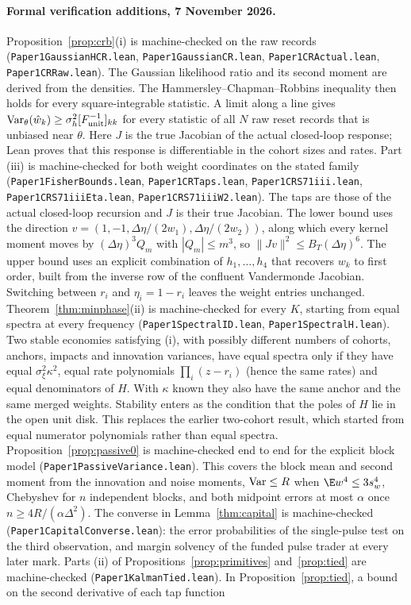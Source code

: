 \paragraph{Formal verification additions, 7 November 2026.} Proposition~\ref{prop:crb}(i) is machine-checked on the raw records (\nolinkurl{Paper1GaussianHCR.lean}, \nolinkurl{Paper1GaussianCR.lean}, \nolinkurl{Paper1CRActual.lean}, \nolinkurl{Paper1CRRaw.lean}). The Gaussian likelihood ratio and its second moment are derived from the densities. The Hammersley--Chapman--Robbins inequality then holds for every square-integrable statistic. A limit along a line gives ${\rm Var}_\theta(\hat w_k)\ge\sigma_h^2[F_{\rm unit}^{-1}]_{kk}$ for every statistic of all $N$ raw reset records that is unbiased near $\theta$. Here $J$ is the true Jacobian of the actual closed-loop response; Lean proves that this response is differentiable in the cohort sizes and rates. Part (iii) is machine-checked for both weight coordinates on the stated family (\nolinkurl{Paper1FisherBounds.lean}, \nolinkurl{Paper1CRTaps.lean}, \nolinkurl{Paper1CRS71iii.lean}, \nolinkurl{Paper1CRS71iiiEta.lean}, \nolinkurl{Paper1CRS71iiiW2.lean}). The taps are those of the actual closed-loop recursion and $J$ is their true Jacobian. The lower bound uses the direction $v=(1,-1,\Delta\eta/(2w_1),\Delta\eta/(2w_2))$, along which every kernel moment moves by $(\Delta\eta)^3Q_m$ with $|Q_m|\le m^3$, so $\|Jv\|^2\le B_T(\Delta\eta)^6$. The upper bound uses an explicit combination of $h_1,\ldots,h_4$ that recovers $w_k$ to first order, built from the inverse row of the confluent Vandermonde Jacobian. Switching between $r_i$ and $\eta_i=1-r_i$ leaves the weight entries unchanged. Theorem~\ref{thm:minphase}(ii) is machine-checked for every $K$, starting from equal spectra at every frequency (\nolinkurl{Paper1SpectralID.lean}, \nolinkurl{Paper1SpectralH.lean}). Two stable economies satisfying (i), with possibly different numbers of cohorts, anchors, impacts and innovation variances, have equal spectra only if they have equal $\sigma_\xi^2\kappa^2$, equal rate polynomials $\prod_i(z-r_i)$ (hence the same rates) and equal denominators of $H$. With $\kappa$ known they also have the same anchor and the same merged weights. Stability enters as the condition that the poles of $H$ lie in the open unit disk. This replaces the earlier two-cohort result, which started from equal numerator polynomials rather than equal spectra. Proposition~\ref{prop:passive0} is machine-checked end to end for the explicit block model (\nolinkurl{Paper1PassiveVariance.lean}). This covers the block mean and second moment from the innovation and noise moments, ${\rm Var}\le R$ when $\E w^4\le3s_w^4$, Chebyshev for $n$ independent blocks, and both midpoint errors at most $\alpha$ once $n\ge4R/(\alpha\Delta^2)$. The converse in Lemma~\ref{thm:capital} is machine-checked (\nolinkurl{Paper1CapitalConverse.lean}): the error probabilities of the single-pulse test on the third observation, and margin solvency of the funded pulse trader at every later mark. Parts (ii) of Propositions~\ref{prop:primitives} and~\ref{prop:tied} are machine-checked (\nolinkurl{Paper1KalmanTied.lean}). In Proposition~\ref{prop:tied}, a bound on the second derivative of each tap function 